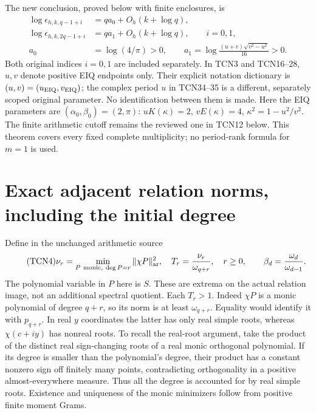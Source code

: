 \documentclass[11pt,a4paper]{article}
\begin{document}
The new conclusion, proved below with finite enclosures, is
\begin{equation}\tag{TCN3}\label{tcn:fourlimits}
 \boxed{\begin{aligned}
 \log\epsilon_{h,k,q-1+i}&=q a_0+O_h(k+\log q),\\
 \log\epsilon_{h,k,2q-1+i}&=q a_1+O_h(k+\log q),\qquad i=0,1,\\
 a_0&=\log(4/\pi)>0,\qquad
 a_1=\log\frac{(u+v)\sqrt{v^2-u^2}}{16}>0.
 \end{aligned}}
\end{equation}
Both original indices $i=0,1$ are included separately.
In TCN3 and TCN16--28, $u,v$ denote positive EIQ endpoints only.
Their explicit notation dictionary is $(u,v)=(u_{\rm EIQ},v_{\rm EIQ})$;
the complex period $u$ in TCN34--35 is a different, separately scoped
original parameter. No identification between them is made.
Here the EIQ parameters are $(\alpha_0,\beta_0)=(2,\pi)$:
$uK(\kappa)=2$, $vE(\kappa)=4$, $\kappa^2=1-u^2/v^2$.
The finite arithmetic cutoff remains the reviewed one in TCN12 below.
This theorem covers every fixed complete multiplicity; no period-rank
formula for $m=1$ is used.

\section{Exact adjacent relation norms, including the initial degree}

Define in the unchanged arithmetic source
\begin{equation}\tag{TCN4}
 \nu_r=\min_{P\ \mathrm{monic},\ \deg P=r}\|\chi P\|_{\mathrm{ar}}^2,
 \quad T_r=\frac{\nu_r}{\omega_{q+r}},\quad r\ge0,
 \qquad \beta_d=\frac{\omega_d}{\omega_{d-1}}.
\end{equation}
The polynomial variable in $P$ here is $S$. These are extrema on the
actual relation image, not an additional spectral quotient. Each $T_r>1$.
Indeed $\chi P$ is a monic polynomial of degree $q+r$, so its norm is
at least $\omega_{q+r}$. Equality would identify it with $p_{q+r}$.
In real $y$ coordinates the latter has only real simple roots, whereas
$\chi(c+iy)$ has nonreal roots. To recall the real-root argument, take
the product of the distinct real sign-changing roots of a real monic
orthogonal polynomial. If its degree is smaller than the polynomial's
degree, their product has a constant nonzero sign off finitely many
points, contradicting orthogonality in a positive almost-everywhere
measure. Thus all the degree is accounted for by real simple roots.
Existence and uniqueness of the monic minimizers follow from positive
finite moment Grams.
\end{document}
